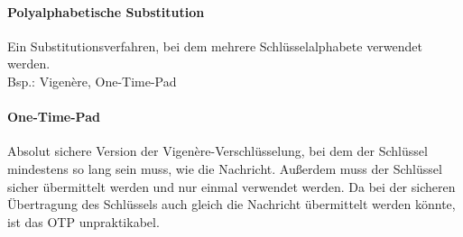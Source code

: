 \documentclass[10pt]{article}
\begin{document}
\paragraph{Polyalphabetische Substitution} Ein Substitutionsverfahren, bei dem mehrere
Schlüsselalphabete verwendet werden.\\
Bsp.: Vigenère, One-Time-Pad
\paragraph{One-Time-Pad} Absolut sichere Version der Vigenère-Verschlüsselung, bei dem der Schlüssel mindestens so lang sein muss, wie die Nachricht. Außerdem muss der Schlüssel sicher übermittelt werden und nur einmal verwendet werden. Da bei der sicheren Übertragung des Schlüssels auch gleich die Nachricht übermittelt werden könnte, ist das OTP unpraktikabel.
\printntexbibliography
\end{document}
